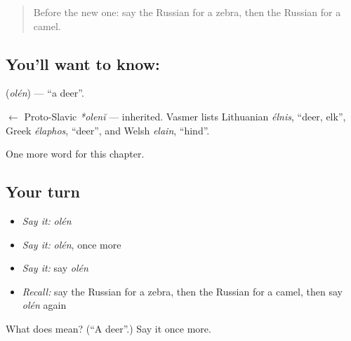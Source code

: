 \label{lesson:RU-C225-olen}



\begin{quote}
Before the new one: say the Russian for a zebra, then the Russian for a camel.
\end{quote}

\subsection*{You'll want to know: }
\textbf{} (\emph{olén}) — \textquotedblleft{}a deer\textquotedblright{}.

\begin{cousinweb}
\textbf{} $\leftarrow$ Proto-Slavic \emph{*olenĭ} — inherited. Vasmer lists Lithuanian \emph{élnis}, \textquotedblleft{}deer, elk\textquotedblright{}, Greek \emph{élaphos}, \textquotedblleft{}deer\textquotedblright{}, and Welsh \emph{elain}, \textquotedblleft{}hind\textquotedblright{}.
\end{cousinweb}

\begin{grammarlens}[title={What you've built}]
One more word for this chapter.
\end{grammarlens}

\subsection*{Your turn}
\begin{itemize}
\raggedright
  \item \emph{Say it:} \emph{olén}
  \item \emph{Say it:} \emph{olén}, once more
  \item \emph{Say it:} say \emph{olén}
  \item \emph{Recall:} say the Russian for a zebra, then the Russian for a camel, then say \emph{olén} again
\end{itemize}

\begin{tcolorbox}[breakable,colback=teal!4,colframe=teal!35!black,title={Before you move on}]
What does  mean? (\textquotedblleft{}A deer\textquotedblright{}.) Say it once more.
\end{tcolorbox}
